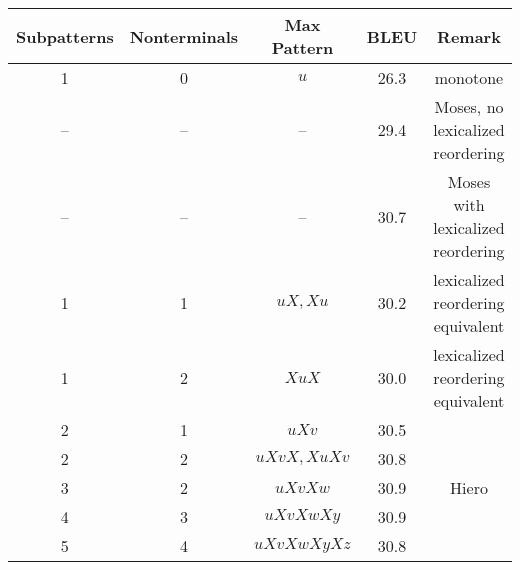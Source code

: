\begin{tabular}{ccccc}
	Subpatterns & Nonterminals & Max Pattern & BLEU & Remark\\ \hline
	1 & 0 & $u$ & 26.3 & monotone \citep[cf.][]{Chiang:2007:cl}\\
	-- & -- & -- & 29.4 & Moses, no lexicalized reordering \\
	-- & -- & -- & 30.7 & Moses with lexicalized reordering \\
	1 & 1 & $uX,Xu$ & 30.2 & lexicalized reordering equivalent\\
	1 & 2 & $XuX$ & 30.0 & lexicalized reordering equivalent\\
	2 & 1 & $uXv$ & 30.5 \\
	2 & 2 & $uXvX,XuXv$ & 30.8 \\
	3 & 2 & $uXvXw$ & 30.9 & Hiero \citep{Chiang:2005:acl,Chiang:2007:cl}\\
	4 & 3 & $uXvXwXy$ & 30.9 \\
	5 & 4 & $uXvXwXyXz$ & 30.8 \\
\end{tabular}
